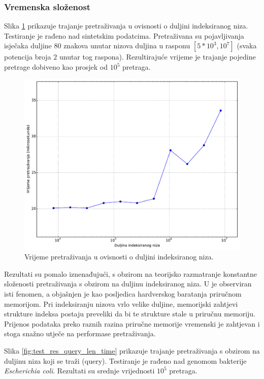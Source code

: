 \documentclass[times, utf8, seminar, numeric]{fer}
\begin{document}
\subsubsection{Vremenska složenost}

Slika \ref{fig:test_res_seq_len_time} prikazuje
trajanje pretraživanja u ovisnosti o duljini indeksiranog niza.
Testiranje je rađeno nad sintetskim podatcima.
Pretraživana su pojavljivanja isječaka duljine 80 znakova unutar nizova duljina u rasponu
$[5 * 10^3, 10^7]$ (svaka potencija broja $2$ unutar tog raspona). Rezultirajuće vrijeme je trajanje
pojedine pretrage dobiveno kao prosjek od $10^5$ pretraga.

\begin{figure}[!htb]
\centering
\includegraphics[width=\textwidth]{fig/test_res_seq_len.pdf}
\caption{Vrijeme pretraživanja u ovisnosti o duljini indeksiranog niza.}
\label{fig:test_res_seq_len_time}
\end{figure}

Rezultati su pomalo iznenađujući, s obzirom na teorijsko razmatranje konstantne složenosti
pretraživanja s obzirom na duljinu indeksiranog niza. U \cite{singer_2012} je observiran
isti fenomen, a objašnjen je kao posljedica hardverskog baratanja priručnom memorijom. Pri indeksiranju
nizova vrlo velike duljine, memorijski zahtjevi strukture indeksa postaju preveliki da bi
te strukture stale u priručnu memoriju. Prijenos podataka preko raznih razina priručne memorije
vremenski je zahtjevan i stoga snažno utječe na performase pretraživanja.

Slika \ref{fig:test_res_query_len_time} prikazuje trajanje pretraživanja
s obzirom na duljinu niza koji se traži (query). Testiranje je rađeno nad genomom
bakterije \textit{Escherichia coli}. Rezultati su srednje vrijednosti $10^5$ pretraga.
\end{document}
